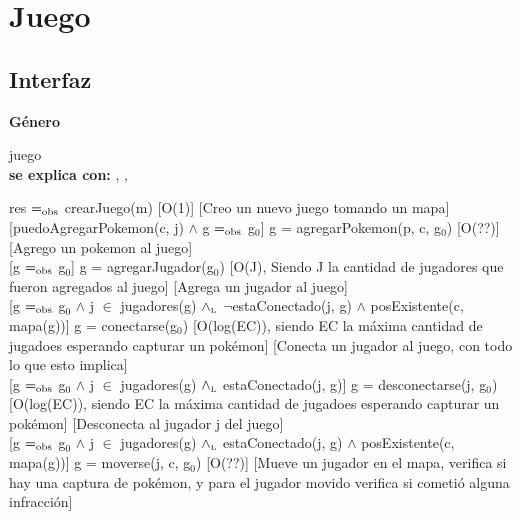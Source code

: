 \section{Juego}

\subsection{Interfaz}

\parbox {1,7cm}{{\bf Género}} juego \\
{\bf se explica con:}  ,  , \\
\medskip

{res $=_{\mathrm{obs}}$ crearJuego(m)}
[O(1)]
[Creo un nuevo juego tomando un mapa]\\

[puedoAgregarPokemon(c, j) $\wedge$ g $=_{\mathrm{obs}}$ g$_0$]
{g = agregarPokemon(p, c, g$_0$)}
[O(??)]
[Agrego un pokemon al juego]\\

[g $=_{\mathrm{obs}}$ g$_0$]
{g = agregarJugador(g$_0$)}
[O(J), Siendo J la cantidad de jugadores que fueron agregados al juego]
[Agrega un jugador al juego]\\

[g $=_{\mathrm{obs}}$ g$_0$ $\wedge$ j $\in$ jugadores(g) $\land_{\mathrm{\scriptscriptstyle{L}}}$ $\neg$estaConectado(j, g) $\wedge$ posExistente(c, mapa(g))]
{g = conectarse(g$_0$)}
[O(log(EC)), siendo EC la máxima cantidad de jugadoes esperando capturar un pokémon]
[Conecta un jugador al juego, con todo lo que esto implica]\\

[g $=_{\mathrm{obs}}$ g$_0$ $\wedge$ j $\in$ jugadores(g) $\land_{\mathrm{\scriptscriptstyle{L}}}$ estaConectado(j, g)]
{g = desconectarse(j, g$_0$)}
[O(log(EC)), siendo EC la máxima cantidad de jugadoes esperando capturar un pokémon]
[Desconecta al jugador j del juego]\\

[g $=_{\mathrm{obs}}$ g$_0$ $\wedge$ j $\in$ jugadores(g) $\land_{\mathrm{\scriptscriptstyle{L}}}$ estaConectado(j, g) $\wedge$ posExistente(c, mapa(g))]
{g = moverse(j, c, g$_0$)}
[O(??)]
[Mueve un jugador en el mapa, verifica si hay una captura de pokémon, y para el jugador movido verifica si cometió alguna infracción]\\

